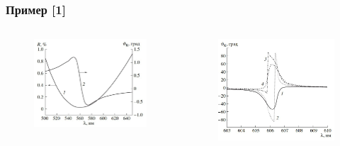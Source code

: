 \documentclass[handout]{beamer}
\begin{document}
\begin{frame}
    \frametitle{Пример [1]}
    \begin{columns}
        \begin{column}{0.5\textwidth}
            \begin{figure}[h]
                \centering
                \includegraphics[width=1\textwidth]{init.jpg}
            \end{figure}
        \end{column}

        \begin{column}{0.5\textwidth}
            \begin{figure}[h]
                \centering
                \includegraphics[width=1\textwidth]{mag_field.jpg}
            \end{figure}
        \end{column}
      \end{columns}
\end{frame}
\end{document}
